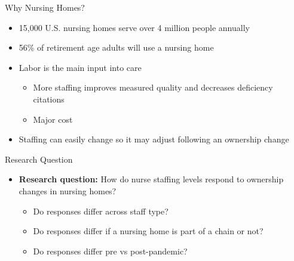 \documentclass{beamer}
\begin{document}
\begin{frame}[t]{Why Nursing Homes?}

\begin{itemize}		
	\setlength{\itemsep}{1em}

	\item 15,000 U.S. nursing homes serve over 4 million people annually
	\item 56\% of retirement age adults will use a nursing home
	\item Labor is the main input into care
	
	\begin{itemize} 
	\setlength{\itemsep}{0.20em}
	
	\item More staffing improves measured quality \citep{lin_2014} and decreases deficiency 		citations \citep{harrington_et_al_2000}
	
	\item Major cost
	
	\end{itemize}
	
	\item Staffing can easily change so it may adjust following an ownership change

\end{itemize}
\end{frame}

\begin{frame}[t]{Research Question}

\begin{itemize}[<+->]
	\item \textbf{Research question:} How do nurse staffing levels respond to ownership changes in nursing 				homes?
	
	\vspace{0.4em}
	\begin{itemize}
		\setlength{\itemsep}{0.7em}
		\item Do responses differ across staff type?
		\item Do responses differ if a nursing home is part of a chain or not?
		\item Do responses differ pre vs post-pandemic?
	\end{itemize}
	
\end{itemize}
\end{frame}
\end{document}
